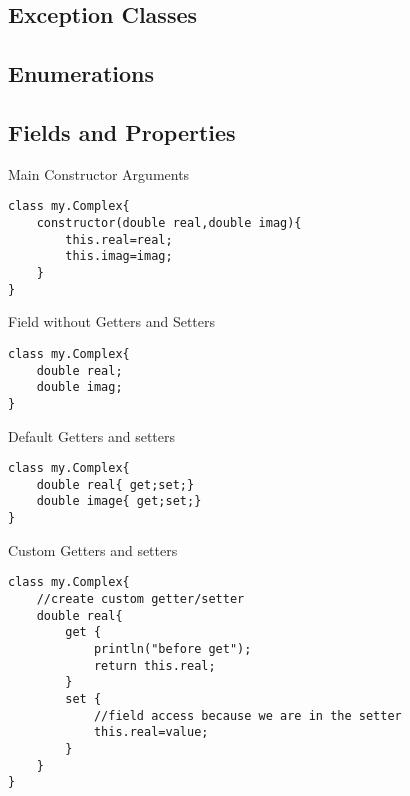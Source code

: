 \documentclass{tufte-book}
\begin{document}
            \subsection{Exception Classes}
            \subsection{Enumerations}



            \subsection{Fields and Properties}

            Main Constructor Arguments
\lstset{mathescape=true}
            \begin{lstlisting}
class my.Complex{
    constructor(double real,double imag){
        this.real=real;
        this.imag=imag;
    }
}
            \end{lstlisting}
\lstset{mathescape=false}

            Field without Getters and Setters
\lstset{mathescape=true}
            \begin{lstlisting}
class my.Complex{
    double real;
    double imag;
}
            \end{lstlisting}
\lstset{mathescape=false}

            
            Default Getters and setters
\lstset{mathescape=true}
            \begin{lstlisting}
class my.Complex{
    double real{ get;set;}
    double image{ get;set;}
}
            \end{lstlisting}
\lstset{mathescape=false}

            
            Custom Getters and setters
\lstset{mathescape=true}
            \begin{lstlisting}
class my.Complex{
    //create custom getter/setter
    double real{
        get {
            println("before get");
            return this.real;
        }
        set {
            //field access because we are in the setter
            this.real=value;
        }
    }
}
            \end{lstlisting}
\lstset{mathescape=false}
\end{document}
